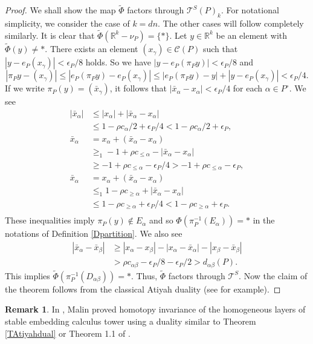 \documentclass[reqno]{amsart}
\theoremstyle{definition}
\newtheorem{rem}[defi]{Remark}
\theoremstyle{plain}
\newcommand{\eps}{\epsilon}
\newcommand{\TT}{\mathcal{T}} %
\newcommand{\TPhi}{\widetilde{\Phi}}
\newcommand{\RR}{\mathbb{R}}
\begin{document}
\begin{proof}
We shall show the map $\TPhi$ factors through $\TT^S(P)_k$. For notational simplicity, we consider the case of $k=dn$. The other cases will follow completely similarly. It is clear that $\TPhi(\RR^{k}-\nu_P)=\{*\}$. Let $y\in \RR^k$ be an element with $\TPhi(y)\not= *$.  There exists an element $(x_\gamma)\in \mathcal{C}(P)$ such that  $| y- e_P(x_\gamma)|<\eps_P/8$ holds. So we have $|y- e_P(\pi_{P}y)|<\eps_P/8$ and
\[
|\pi_P y-(x_\gamma)|\leq|e_P(\pi_P y)-e_P(x_\gamma)|\leq | e_P(\pi_P y)-y|+|y-e_P(x_\gamma)|<\eps_P/4.
\]
 If we write  $\pi_P(y)=(\bar x_\gamma)$, it follows that $|\bar x_\alpha-x_\alpha|<\eps_P/4$ for each  $\alpha\in P^\circ$. 
We see
\[
\begin{split}
|\bar x_\alpha| & \leq |x_\alpha|+|\bar x_\alpha-x_\alpha| \\
& \leq 1-\rho c_\alpha/2+\eps_P/4<1-\rho c_\alpha/2+\eps_P, \\
\bar x_\alpha  & =x_\alpha+(\bar x_\alpha-x_\alpha) \\
&\geq_1-1+\rho c_{\leq \alpha}-|\bar x_\alpha-x_\alpha|  \\
& \geq -1+\rho c_{\leq \alpha}-\eps_P/4>-1+\rho c_{\leq \alpha}-\eps_P, \\
\bar x_\alpha & = x_\alpha+(\bar x_\alpha-x_\alpha)  \\
 & \leq_1 1-\rho c_{\geq \alpha} +|\bar x_\alpha-x_\alpha|  \\
& \leq 1-\rho c_{\geq \alpha}+\eps_P/4<1-\rho c_{\geq \alpha}+\eps_P. \\
\end{split}
\]
These inequalities imply $\pi_P(y)\not\in E_\alpha$ and so $\Phi(\pi_P^{-1}(E_\alpha))=*$ in the notations of Definition  \ref{Dpartition}. We also see
\[
\begin{split}
|\bar x_\alpha -\bar x_\beta| & \geq  |x_\alpha-x_\beta|-|x_\alpha-\bar x_\alpha |-|x_\beta-\bar x_\beta| \\
 & > \rho c_{\alpha\beta}-\eps_P/8-\eps_P/2  
  > d_{\alpha\beta}(P).
\end{split}
\]
This implies $\TPhi(\pi_P^{-1}(D_{\alpha\beta}))=*$. Thus, $\TPhi$ factors through $\TT^S$. Now the claim of the theorem follows from the classical Atiyah duality  (see \cite{browder} for example).





\end{proof}
\begin{rem}\label{RMalin}
In \cite{malin}, Malin  proved homotopy invariance of the homogeneous layers of stable embedding calculus tower using  a duality similar to Theorem \ref{TAtiyahdual} or Theorem 1.1 of \cite{moriya1}.
\end{rem}
\end{document}
